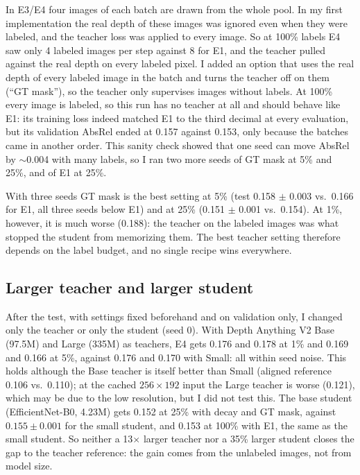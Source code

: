 \documentclass[11pt]{article}
\begin{document}
In E3/E4 four images of each batch are drawn from the whole pool. In my first implementation the
real depth of these images was ignored even when they were labeled, and the teacher loss was
applied to every image. So at 100\% labels E4 saw only 4 labeled images per step against 8 for E1,
and the teacher pulled against the real depth on every labeled pixel. I added an option that uses
the real depth of every labeled image in the batch and turns the teacher off on them (``GT mask''),
so the teacher only supervises images without labels. At 100\% every image is labeled, so this run
has no teacher at all and should behave like E1: its training loss indeed matched E1 to the third
decimal at every evaluation, but its validation AbsRel ended at 0.157 against 0.153, only because
the batches came in another order. This sanity check showed that one seed can move AbsRel by
$\sim$0.004 with many labels, so I ran two more seeds of GT mask at 5\% and 25\%, and of E1 at
25\%.

With three seeds GT mask is the best setting at 5\% (test 0.158 $\pm$ 0.003 vs.\ 0.166 for E1,
all three seeds below E1) and at 25\% (0.151 $\pm$ 0.001 vs.\ 0.154). At 1\%, however, it is much
worse (0.188): the teacher on the labeled images was what stopped the student from memorizing
them. The best teacher setting therefore depends on the label budget, and no single recipe wins
everywhere.

\subsection{Larger teacher and larger student}

After the test, with settings fixed beforehand and on validation only, I changed only the teacher or
only the student (seed 0). With Depth Anything V2 Base (97.5M) and Large (335M) as teachers, E4
gets 0.176 and 0.178 at 1\% and 0.169 and 0.166 at 5\%, against 0.176 and 0.170 with Small: all
within seed noise. This holds although the Base teacher is itself better than Small (aligned
reference 0.106 vs.\ 0.110); at the cached $256\times192$ input the Large teacher is worse (0.121),
which may be due to the low resolution, but I did not test this. The base student (EfficientNet-B0,
4.23M) gets 0.152 at 25\% with decay and GT mask, against $0.155\pm0.001$ for the small student,
and 0.153 at 100\% with E1, the same as the small student. So neither a 13$\times$ larger teacher nor a
35\% larger student closes the gap to the teacher reference: the gain comes from the unlabeled
images, not from model size.
\end{document}
